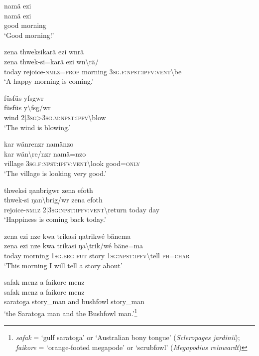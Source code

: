 \ea\label{ex:3:a7460}
namä ezi\\
\gll namä	ezi\\
     good	morning\\
\glt `Good morning!'
\z

\ea\label{ex:3:a7461}
zena thweksikarä ezi wnrä\\
\gll zena	thwek-si=karä	ezi	wn{\textbackslash}rä/\\
     today	rejoice-\textsc{nmlz}=\textsc{prop}	morning	3\textsc{sg}.\textsc{f}:\textsc{npst}:\textsc{ipfv}:\textsc{vent}{\textbackslash}be\\
\glt `A happy morning is coming.'
\z

\ea\label{ex:3:a7462}
füsfüs yfsgwr\\
\gll füsfüs	y{\textbackslash}fsg/wr\\
     wind	2|3\textsc{sg}>3\textsc{sg}.\textsc{m}:\textsc{npst}:\textsc{ipfv}{\textbackslash}blow\\
\glt `The wind is blowing.'
\z

\ea\label{ex:3:a7463}
kar wänrenzr namänzo\\
\gll kar	wän{\textbackslash}re/nzr	namä=nzo\\
     village	3\textsc{sg}.\textsc{f}:\textsc{npst}:\textsc{ipfv}:\textsc{vent}{\textbackslash}look	good=\textsc{only}\\
\glt `The village is looking very good.'
\z

\ea\label{ex:3:a7464}
thweksi ŋanbrigwr zena efoth\\
\gll thwek-si	ŋan{\textbackslash}brig/wr	zena	efoth\\
     rejoice-\textsc{nmlz}	2|3\textsc{sg}:\textsc{npst}:\textsc{ipfv}:\textsc{vent}{\textbackslash}return	today	day\\
\glt `Happiness is coming back today.'
\z

\ea\label{ex:3:a7465}
zena ezi nze kwa trikasi ŋatrikwé bänema\\
\gll zena	ezi	nze	kwa	trikasi	ŋa{\textbackslash}trik/wé	bäne=ma\\
     today	morning	1\textsc{sg}.\textsc{erg}	\textsc{fut}	story	1\textsc{sg}:\textsc{npst}:\textsc{ipfv}{\textbackslash}tell	\textsc{ph}=\textsc{char}\\
\glt `This morning I will tell a story about'
\z

\ea\label{ex:3:a7467}
safak menz a faikore menz\\
\gll safak	menz	a	faikore	menz\\
     saratoga	story\_man	and	bushfowl	story\_man\\
\glt `the Saratoga man and the Bushfowl man.'\footnote{\textit{safak} = `gulf saratoga' or `Australian bony tongue' (\textit{Scleropages jardinii}); \textit{faikore} = `orange-footed megapode' or `scrubfowl' (\textit{Megapodius reinwardt})}
\z

